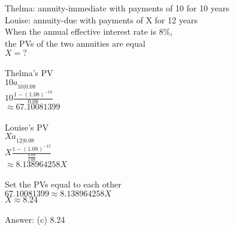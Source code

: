 \documentclass[12pt]{article}
\begin{document}
\section{}
Thelma: annuity-immediate with payments of 10 for 10 years\\
Louise: annuity-due with payments of X for 12 years\\
When the annual effective interest rate is $8\%$,\\
the PVs of the two annuities are equal\\
$X=?$\\
\\
Thelma's PV\\
$10a_{\overline{10|}0.08}$\\
$10\frac{1-(1.08)^{-10}}{0.08}$\\
$\approx67.10081399$\\
\\
Louise's PV\\
$X\ddot a_{\overline{12|}0.08}$\\
$X\frac{1-(1.08)^{-12}}{\frac{0.08}{1.08}}$\\
$\approx8.138964258X$\\
\\
Set the PVs equal to each other\\
$67.10081399\approx8.138964258X$\\
$X\approx8.24$\\
\\
Answer: (c) 8.24
\end{document}
